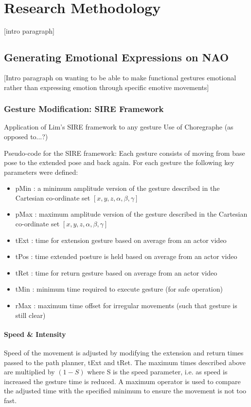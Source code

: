 \documentclass[11pt,a4paper]{report}
\begin{document}
\chapter{Research Methodology}
[intro paragraph]
\section{Generating Emotional Expressions on NAO}
[Intro paragraph on wanting to be able to make functional gestures emotional rather than expressing emotion through specific emotive movements]
\subsection{Gesture Modification: SIRE Framework}
Application of Lim's SIRE framework to any gesture
Use of Choregraphe (as opposed to...?)

Pseudo-code for the SIRE framework:
Each gesture consists of moving from base pose to the extended pose and back again. For each gesture the following key parameters were defined:
\begin{itemize}
\item pMin : a minimum amplitude version of the gesture described in the Cartesian co-ordinate set $[x,y,z,\alpha,\beta,\gamma]$
\item pMax : maximum amplitude version of the gesture described in the Cartesian co-ordinate set $[x,y,z,\alpha,\beta,\gamma]$
\item tExt : time for extension gesture based on average from an actor video
\item tPos : time extended posture is held based on average from an actor video
\item tRet : time for return gesture based on average from an actor video
\item tMin : minimum time required to execute gesture (for safe operation)
\item rMax : maximum time offset for irregular movements (such that gesture is still clear)
\end{itemize}

\subsubsection{Speed \& Intensity}
Speed of the movement is adjusted by modifying the extension and return times passed to the path planner, tExt and tRet. The maximum times described above are multiplied by $(1-S)$ where S is the speed parameter, i.e. as speed is increased the gesture time is reduced. A maximum operator is used to compare the adjusted time with the specified minimum to ensure the movement is not too fast.
\end{document}
